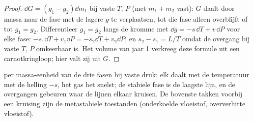 \begin{proof}
$\dd G = (g_1 - g_2)\dd m_1$ bij vaste $T$, $P$ (met $m_1 + m_2$ vast):
$G$ daalt door massa naar de fase met de lagere $g$ te verplaatsen, tot die
fase alleen overblijft of tot $g_1 = g_2$. Differentieer $g_1 = g_2$ langs de
kromme met $\dd g = -s\,\dd T + v\,\dd P$ voor elke fase:
$-s_1\dd T +
v_1\dd P = -s_2\dd T + v_2\dd P$; en $s_2 - s_1 = L/T$ omdat de
overgang
bij vaste $T$, $P$ omkeerbaar is. Het volume van jaar 1 verkreeg deze formule
uit een carnotkringloop; hier valt zij uit $G$.
\end{proof}

\begin{omfigure}

{\small {} per massa-eenheid van de drie fasen bij vaste
druk: elk daalt met de temperatuur met de helling $-s$, het gas het
snelst; de stabiele fase is de laagste lijn, en de overgangen gebeuren
waar de lijnen elkaar kruisen. De bovenste takken voorbij een kruising zijn de
metastabiele toestanden (onderkoelde vloeistof, oververhitte vloeistof).}
\end{omfigure}

